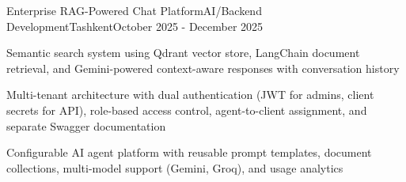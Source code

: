 \begin{resume_employer}{Enterprise RAG-Powered Chat Platform}{AI/Backend Development}{Tashkent}{October 2025 - December 2025}
\item Semantic search system using Qdrant vector store, LangChain document retrieval, and Gemini-powered context-aware responses with conversation history
\item Multi-tenant architecture with dual authentication (JWT for admins, client secrets for API), role-based access control, agent-to-client assignment, and separate Swagger documentation
\item Configurable AI agent platform with reusable prompt templates, document collections, multi-model support (Gemini, Groq), and usage analytics
\end{resume_employer}
